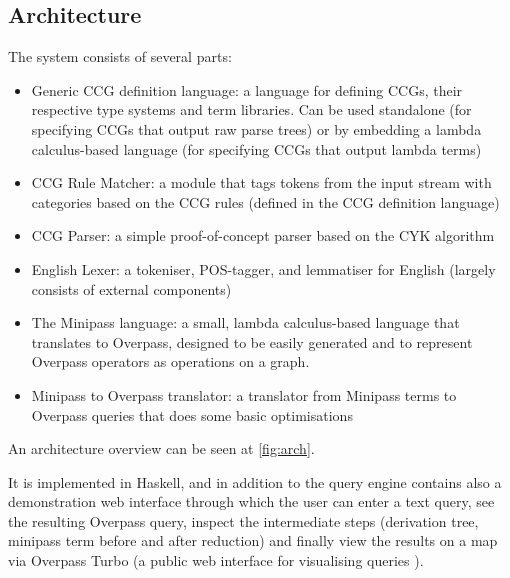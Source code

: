 \documentclass[main.tex]{subfiles}
\begin{document}

\subsection{Architecture}
The system consists of several parts:


\begin{itemize}
    \item Generic CCG definition language: a language for defining CCGs,
          their respective type systems and term libraries. Can be used
          standalone (for specifying CCGs that output raw parse trees)
          or by embedding a lambda calculus-based language (for specifying
          CCGs that output lambda terms)

    \item CCG Rule Matcher: a module that tags tokens from the input stream
          with categories based on the CCG rules (defined in the CCG definition
          language)

    \item CCG Parser: a simple proof-of-concept parser based on the CYK
          algorithm

    \item English Lexer: a tokeniser, POS-tagger, and lemmatiser for English
          (largely consists of external components)

    \item The Minipass language: a small, lambda calculus-based language
          that translates to Overpass, designed to be easily generated and
          to represent Overpass operators as operations on a graph.

    \item Minipass to Overpass translator: a translator from Minipass terms
          to Overpass queries that does some basic optimisations
\end{itemize}

An architecture overview can be seen at \cref{fig:arch}.

It is implemented in Haskell, and in addition to the query engine contains also
a demonstration web interface through which the user can enter a text query,
see the resulting Overpass query, inspect the intermediate steps (derivation
tree, minipass term before and after reduction) and finally view the results
on a map via Overpass Turbo (a public web interface for visualising queries
\cite{overpassturbo}).
\end{document}
